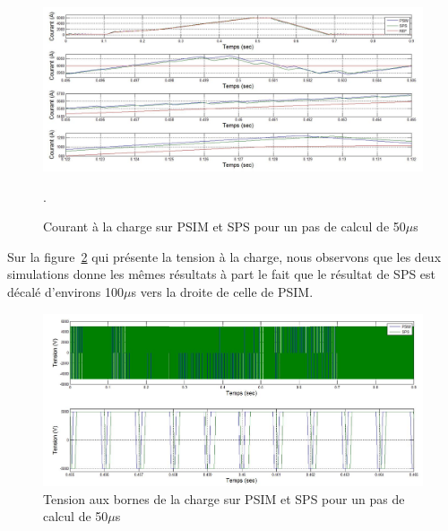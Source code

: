 \documentclass[11pt,letterpaper,final]{report}
\begin{document}
\begin{figure}[htb]
\centering
\includegraphics[scale=0.5]{Fig/Hacheur4Quadrants/HacheurCourantCharge50u.jpg}
\caption{Courant à la charge sur PSIM et SPS pour un pas de calcul de 50$\mu$s}.
\label{comp_PSIM_SPS}
\end{figure}
Sur la figure~\ref{err_cou} qui présente la tension à la charge, nous observons que les deux simulations donne les mêmes résultats à part le fait que le résultat de SPS est décalé d'environs 100$\mu$s vers la droite de celle de PSIM.

\begin{figure}[htb]
\centering
\includegraphics[scale=0.5]{Fig/Hacheur4Quadrants/HacheurTensionCharge50u.jpg}
\caption{Tension aux bornes de la charge sur PSIM et SPS pour un pas de calcul de 50$\mu$s}
\label{err_cou}
\end{figure}
\end{document}
